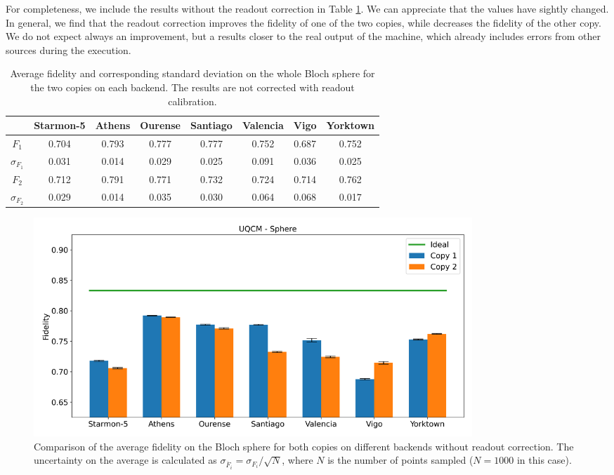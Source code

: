 For completeness, we include the results without the readout correction in Table \ref{tab:uqcm_results_full_sphere_non}. We can appreciate that the values have sightly changed. In general, we find that the readout correction improves the fidelity of one of the two copies, while decreases the fidelity of the other copy. We do not expect always an improvement, but a results closer to the real output of the machine, which already includes errors from other sources during the execution.
 
\begin{table}[H]
    \centering
    \begin{tabular}{|c|c|c|c|c|c|c|c|}
    \hline
    \textbf{} & \textbf{Starmon-5} & \textbf{Athens} & \textbf{Ourense} & \textbf{Santiago} & \textbf{Valencia} & \textbf{Vigo} & \textbf{Yorktown} \\ \hline
    $F_1$              & 0.704 & 0.793 & 0.777 & 0.777 & 0.752 & 0.687 & 0.752\\ \hline
    $\sigma_{F_1}$     & 0.031 & 0.014 & 0.029 & 0.025 & 0.091 & 0.036 & 0.025 \\ \hline
    $F_2$              & 0.712 & 0.791 & 0.771 & 0.732 & 0.724 & 0.714 & 0.762 \\ \hline
    $\sigma_{F_2}$     & 0.029 & 0.014 & 0.035 & 0.030 & 0.064 & 0.068 & 0.017 \\ \hline
    \end{tabular}
    \caption{Average fidelity and corresponding standard deviation on the whole Bloch sphere for the two copies on each backend. The
results are not corrected with readout calibration.}\label{tab:uqcm_results_full_sphere_non}
\end{table}

\begin{figure}[H]
    \centering
            \includegraphics[width=0.8\textwidth]{Figures/UQCM/Histograms/histo_sphere_corrected.png}
        
        \caption{Comparison of the average fidelity on the Bloch sphere for both copies on different backends without readout correction. The uncertainty on the average is calculated as $\sigma_{\overline{F}_i}=\sigma_{F_i}/\sqrt{N}$, where $N$ is the number of points sampled ($N=1000$ in this case).}\label{fig:hist_uqcm_sphere_nonc}
\end{figure}


